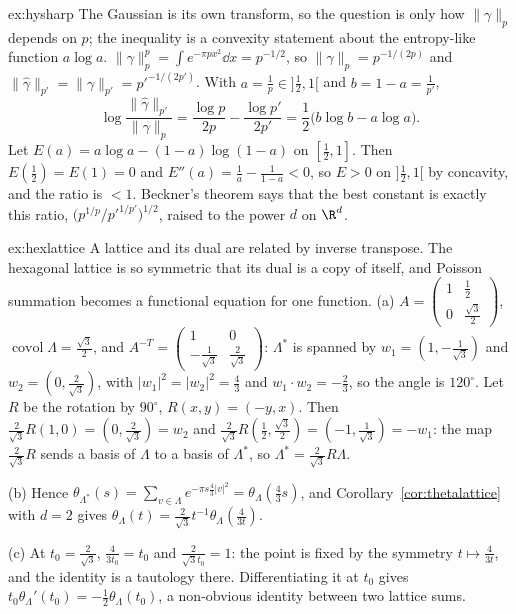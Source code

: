 \begin{solution}{ex:hysharp}
\idea The Gaussian is its own transform, so the question is only how $\|\gamma\|_p$ depends on $p$; the inequality is a convexity statement about the entropy-like function $a\log a$.
\writeup $\|\gamma\|_p^p=\int e^{-\pi px^2}\dd x=p^{-1/2}$, so $\|\gamma\|_p=p^{-1/(2p)}$ and $\|\hat\gamma\|_{p'}=\|\gamma\|_{p'}=p'^{-1/(2p')}$. With $a=\frac1p\in]\frac12,1[$ and $b=1-a=\frac1{p'}$,
\[\log\frac{\|\hat\gamma\|_{p'}}{\|\gamma\|_p}=\frac{\log p}{2p}-\frac{\log p'}{2p'}=\frac12\bigl(b\log b-a\log a\bigr).\]
Let $E(a)=a\log a-(1-a)\log(1-a)$ on $[\frac12,1]$. Then $E(\frac12)=E(1)=0$ and $E''(a)=\frac1a-\frac1{1-a}<0$, so $E>0$ on $]\frac12,1[$ by concavity, and the ratio is $<1$. Beckner's theorem says that the
best constant is exactly this ratio, $\bigl(p^{1/p}/p'^{1/p'}\bigr)^{1/2}$, raised to the power $d$ on $\R^d$.
\end{solution}

\begin{solution}{ex:hexlattice}
\idea A lattice and its dual are related by inverse transpose. The hexagonal lattice is so symmetric that its dual is a copy of itself, and Poisson summation becomes a functional equation for one function.
\writeup (a) $A=\begin{pmatrix}1&\frac12\\0&\frac{\sqrt3}2\end{pmatrix}$, $\operatorname{covol}\Lambda=\frac{\sqrt3}2$, and $A^{-T}=\begin{pmatrix}1&0\\-\frac1{\sqrt3}&\frac2{\sqrt3}\end{pmatrix}$: $\Lambda^*$ is spanned by $w_1=(1,-\frac1{\sqrt3})$ and
$w_2=(0,\frac2{\sqrt3})$, with $|w_1|^2=|w_2|^2=\frac43$ and $w_1\cdot w_2=-\frac23$, so the angle is $120^\circ$. Let $R$ be the rotation by $90^\circ$, $R(x,y)=(-y,x)$. Then $\frac2{\sqrt3}R(1,0)=(0,\frac2{\sqrt3})=w_2$ and $\frac2{\sqrt3}R(\frac12,\frac{\sqrt3}2)=(-1,\frac1{\sqrt3})=-w_1$: the map
$\frac2{\sqrt3}R$ sends a basis of $\Lambda$ to a basis of $\Lambda^*$, so $\Lambda^*=\frac2{\sqrt3}R\Lambda$.

(b) Hence $\theta_{\Lambda^*}(s)=\sum_{v\in\Lambda}e^{-\pi s\frac43|v|^2}=\theta_\Lambda(\frac43s)$, and Corollary~\ref{cor:thetalattice} with $d=2$ gives $\theta_\Lambda(t)=\frac2{\sqrt3}t^{-1}\theta_\Lambda(\frac4{3t})$.

(c) At $t_0=\frac2{\sqrt3}$, $\frac4{3t_0}=t_0$ and $\frac2{\sqrt3t_0}=1$: the point is fixed by the symmetry $t\mapsto\frac4{3t}$, and the identity is a tautology there. Differentiating it at $t_0$ gives
$t_0\theta_\Lambda'(t_0)=-\frac12\theta_\Lambda(t_0)$, a non-obvious identity between two lattice sums.
\end{solution}

